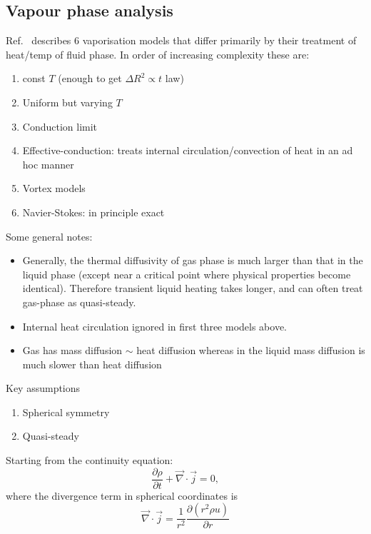 \documentclass[12pt,twoside]{report}
\begin{document}
\subsection{Vapour phase analysis}

Ref.\ \cite{Sirignano2010} describes 6 vaporisation models that differ primarily by their treatment of heat/temp of fluid phase.
In order of increasing complexity these are:
\begin{enumerate}
\item const $T$ (enough to get $\Delta R^2 \propto t$ law)
\item Uniform but varying $T$
\item Conduction limit
\item Effective-conduction: treats internal circulation/convection of heat in an ad hoc manner
\item Vortex models
\item Navier-Stokes: in principle exact
\end{enumerate}

Some general notes:
\begin{itemize}
\item Generally, the thermal diffusivity of gas phase is much larger than that in the liquid phase (except near a critical point where physical properties become identical).
  Therefore transient liquid heating takes longer, and can often treat gas-phase as quasi-steady.
\item Internal heat circulation ignored in first three models above.
\item Gas has mass diffusion $\sim$ heat diffusion whereas in the liquid mass diffusion is much slower than heat diffusion
\end{itemize}

Key assumptions
\begin{enumerate}
\item Spherical symmetry
\item Quasi-steady
\end{enumerate}

Starting from the continuity equation:
\begin{equation}\label{eq:continuity-eqn}
  \frac{\partial \rho}{\partial t}
  + \vec{\nabla} \cdot \vec{j} = 0,
\end{equation}
where the divergence term in spherical coordinates is
\begin{equation}
  \vec{\nabla} \cdot \vec{j} =
  \frac{1}{r^2} \frac{\partial (r^2 \rho u)}{\partial r}
\end{equation}
\end{document}
